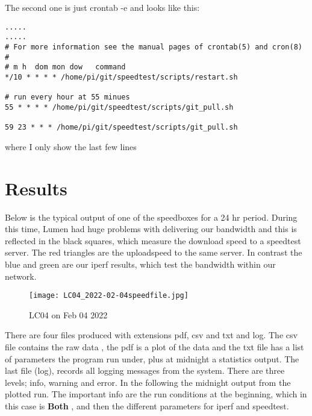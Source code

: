 \documentclass[11pt]{article}
\begin{document}
The second one is just crontab -e and looks like this:
\begin{verbatim}
.....
.....
# For more information see the manual pages of crontab(5) and cron(8)
# 
# m h  dom mon dow   command
*/10 * * * * /home/pi/git/speedtest/scripts/restart.sh

# run every hour at 55 minues
55 * * * * /home/pi/git/speedtest/scripts/git_pull.sh

59 23 * * * /home/pi/git/speedtest/scripts/git_pull.sh

\end{verbatim}

where I only show the last few lines


\section{Results}

Below is the typical output of one of the speedboxes for a 24 hr period. During this time, Lumen had huge problems with delivering our bandwidth and this is reflected in the black squares, which measure the download speed to a speedtest server. The red triangles are the uploadspeed to the same server. In contrast the blue and green are our iperf results, which test the bandwidth within our network.


\begin{figure}[H]%
  \centering
  \texttt{[image: LC04\_2022-02-04speedfile.jpg]}
  \caption{LC04 on Feb 04 2022}
  \label{fig:LC04}
\end{figure}

There are four files produced with extensions pdf, csv and txt and log. The csv file contains the raw data , the pdf is a plot of the data and the txt file has a list of parameters the program run under, plus at midnight a statistics output. The last file (log), records all logging messages from the system. There are three levels; info, warning and error.
In the following the midnight output from the plotted run. The important info are the run conditions at the beginning, which in this case is \textbf{Both} , and then the different parameters for iperf and speedtest.
\end{document}
